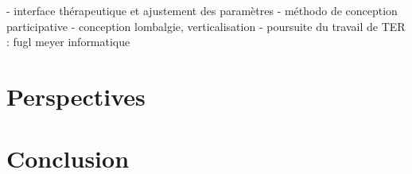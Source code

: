 \documentclass{beamer}
\begin{document}
		\begin{frame}
			- interface thérapeutique et ajustement des paramètres
			- méthodo de conception participative
			- conception lombalgie, verticalisation
			- poursuite du travail de TER : fugl meyer informatique
		\end{frame}
	
	\section{Perspectives}
		\begin{frame}
		
		\end{frame}
	
	\section{Conclusion}
		\begin{frame}
		
		\end{frame}
\end{document}
